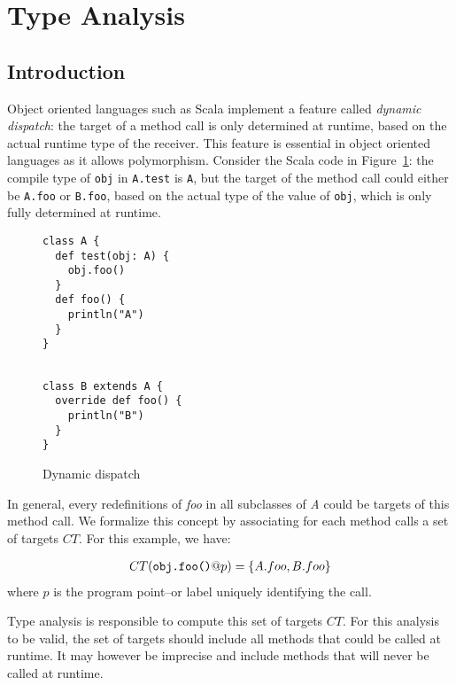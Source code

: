 \section{Type Analysis}

\subsection{Introduction}
Object oriented languages such as Scala implement a feature called
\emph{dynamic dispatch}: the target of a method call is only determined at
runtime, based on the actual runtime type of the receiver. This feature is
essential in object oriented languages as it allows polymorphism. Consider the
Scala code in Figure~\ref{fig:ta:example1}: the compile type of \verb/obj/ in
\verb/A.test/ is \verb/A/, but the target of the method call could either be
\verb/A.foo/ or \verb/B.foo/, based on the actual type of the value of
\verb/obj/, which is only fully determined at runtime.

\begin{figure}[h]
    \centering
\begin{minipage}[tl]{0.6\linewidth}
    \centering
\lstset{linewidth=0.6\linewidth}
\begin{lstlisting}
class A {
  def test(obj: A) {
    obj.foo()
  }
  def foo() {
    println("A")
  }
}
\end{lstlisting}
\end{minipage}
\begin{minipage}[tl]{0.6\linewidth}
    \centering
\lstset{linewidth=0.6\linewidth}
\begin{lstlisting}

class B extends A {
  override def foo() {
    println("B")
  }
}
\end{lstlisting}
\end{minipage}
    \caption{Dynamic dispatch}
    \label{fig:ta:example1}
\end{figure}

In general, every redefinitions of \emph{foo} in all subclasses of \emph{A}
could be targets of this method call. We formalize this concept by associating
for each method calls a set of targets $CT$. For this example, we have:

\begin{eqnarray*}
    CT(\verb/obj.foo()/@p) = \{A.foo, B.foo\}
\end{eqnarray*}
where $p$ is the program point--or label uniquely identifying the call.

Type analysis is responsible to compute this set of targets $CT$. For this
analysis to be valid, the set of targets should include all methods that could
be called at runtime. It may however be imprecise and include methods that will
never be called at runtime.

